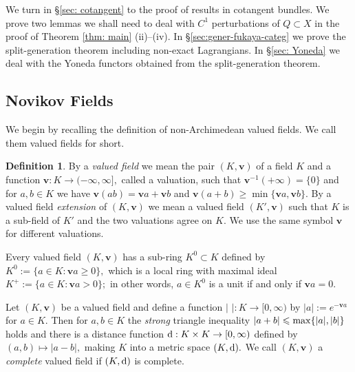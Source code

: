 \documentclass{article}
\theoremstyle{plain}%
\theoremstyle{definition}
\newtheorem{dfn}[thm]{Definition}
\numberwithin{equation}{section}
\numberwithin{figure}{section}
\def\l{\label}
\def\ge{\geqslant}
\def\le{\leqslant\nobreak}
\def\iy{\infty}
\def\v{{\mathbf{v}}}\def\cl{{\rm cl}}\def\alg{{\rm alg}}\def\geom{{\rm geom}}\def\loc{{\rm loc}}\def\dirlim{\displaystyle\varinjlim}
\begin{document}
We turn in \S\ref{sec: cotangent} to the proof of results in cotangent bundles. We prove two lemmas we shall need to deal with $C^1$ perturbations of $Q\subset X$ in the proof of Theorem \ref{thm: main} (ii)--(iv). In \S\ref{sec:gener-fukaya-categ} we prove the split-generation theorem including non-exact Lagrangians. In \S\ref{sec: Yoneda} we deal with the Yoneda functors obtained from the split-generation theorem. 


\subsection{Novikov Fields}\l{sec: Nov}
We begin by recalling the definition of non-Archimedean valued fields. We call them valued fields for short. 
\begin{dfn}
By a {\it valued field} we mean the pair $(K,\v)$ of a field $K$ and a function $\v: K\to(-\iy,\iy],$ called a valuation, such that $\v^{-1}(+\iy)=\{0\}$ and for $a,b\in K$ we have $\v(ab)=\v a+\v b$ and $\v(a+b)\ge \min\{\v a,\v b\}.$
By a valued field {\it extension} of $(K,\v)$ we mean a valued field $(K',\v)$ such that $K$ is a sub-field of $K'$ and the two valuations agree on $K.$ We use the same symbol $\v$ for different valuations.

Every valued field $(K,\v)$ has a sub-ring $K^0\subset K$ defined by $K^0:=\{a\in K:\v a\ge0\},$ which is a local ring with maximal ideal $K^+:=\{a\in  K:\v a>0\};$ in other words, $a\in  K^0$ is a unit if and only if $\v a=0.$

Let $(  K,\v)$ be a valued field and define a function $|\,\,|:  K\to[0,\iy)$ by $|a|:=e^{-\v a}$ for $a\in   K.$ Then for $a,b\in   K$ the {\it strong} triangle inequality $|a+b|\le\max\{|a|,|b|\}$ holds and there is a distance function ${\rm d}:  K\times   K\to[0,\iy)$ defined by $(a,b)\mapsto|a-b|,$ making $  K$ into a metric space $(  K,{\rm d}).$
We call $(  K,\v)$ a {\it complete} valued field if $(  K,{\rm d})$ is complete.
\end{dfn}
\end{document}
